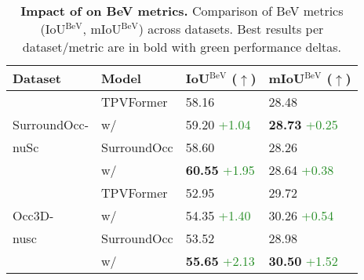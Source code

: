 \begin{table}[t]
    \centering
    \small
{
    \setlength{\tabcolsep}{3pt}
    \begin{tabular}{@{}l l l l@{}}
        \toprule
        Dataset & Model & IoU$^\text{BeV}$ ($\uparrow$) & mIoU$^\text{BeV}$ ($\uparrow$) \\
        \midrule
        
        & TPVFormer \citep{huang2023tpv} & 58.16 & 28.48 \\
        \rowcolor{Apricot!20!}\cellcolor{white}SurroundOcc- 
        & \hspace{0.3cm} w/ \method{} & 59.20 \textcolor{ForestGreen}{+1.04} & \textbf{28.73} \textcolor{ForestGreen}{+0.25} \\

        nuSc \citep{wei2023surroundocc} & SurroundOcc \citep{wei2023surroundocc} & 58.60 & 28.26 \\
        \rowcolor{Apricot!20!} \cellcolor{white}
         & \hspace{0.3cm} w/ \method{} & \textbf{60.55} \textcolor{ForestGreen}{+1.95} & 28.64 \textcolor{ForestGreen}{+0.38}\\
        \midrule
        
        & TPVFormer \citep{huang2023tpv} & 52.95 & 29.72 \\
        
        \rowcolor{Apricot!20!}  \cellcolor{white}Occ3D- 
        & \hspace{0.3cm} w/ \method{} & 54.35 \textcolor{ForestGreen}{+1.40} & 30.26 \textcolor{ForestGreen}{+0.54} \\
        
        nusc \citep{tian2023occ3d} & SurroundOcc \citep{wei2023surroundocc} & 53.52 & 28.98 \\
        \rowcolor{Apricot!20!} \cellcolor{white}
         &  \hspace{0.3cm} w/ \method{} & \textbf{55.65} \textcolor{ForestGreen}{+2.13} & \textbf{30.50} \textcolor{ForestGreen}{+1.52} \\
        \bottomrule
    \end{tabular}
}
    
    \caption{\textbf{Impact of \method{} on BeV metrics.} Comparison of BeV metrics (IoU$^\text{BeV}$, mIoU$^\text{BeV}$) across datasets. Best results per dataset/metric are in bold with green performance deltas. %
    }
    \label{tab:bev_metrics}
\end{table}
